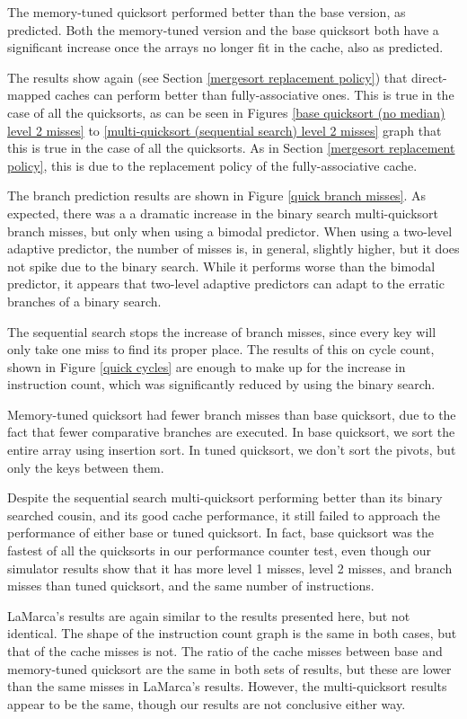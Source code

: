 The memory-tuned quicksort performed better than the base version, as predicted.
Both the memory-tuned version and the base quicksort both have a significant
increase once the arrays no longer fit in the cache, also as predicted.

The results show again (see Section \ref{mergesort replacement policy}) that
direct-mapped caches can perform better than fully-associative ones. This is
true in the case of all the quicksorts, as can be seen in Figures \ref{base
quicksort (no median) level 2 misses} to \ref{multi-quicksort (sequential
search) level 2 misses} graph that this is true in the case of all the
quicksorts. As in Section \ref{mergesort replacement policy}, this is due to the
replacement policy of the fully-associative cache.

The branch prediction results are shown in Figure \ref{quick branch misses}. As
expected, there was a a dramatic increase in the binary search multi-quicksort
branch misses, but only when using a bimodal predictor. When using a two-level
adaptive predictor, the number of misses is, in general, slightly higher, but it
does not spike due to the binary search. While it performs worse than the
bimodal predictor, it appears that two-level adaptive predictors can adapt to
the erratic branches of a binary search.

The sequential search stops the increase of branch misses, since every key will
only take one miss to find its proper place. The results of this on cycle
count, shown in Figure \ref{quick cycles} are enough to make up for the increase
in instruction count, which was significantly reduced by using the binary
search.

Memory-tuned quicksort had fewer branch misses than base quicksort, due to the fact
that fewer comparative branches are executed. In base quicksort, we sort the
entire array using insertion sort. In tuned quicksort, we don't sort the pivots,
but only the keys between them.

Despite the sequential search multi-quicksort performing better than its
binary searched cousin, and its good cache performance, it still failed to
approach the performance of either base or tuned quicksort. In fact, base
quicksort was the fastest of all the quicksorts in our performance counter test,
even though our simulator results show that it has more level 1 misses, level 2
misses, and branch misses than tuned quicksort, and the same number of
instructions.

LaMarca's results are again similar to the results presented here, but not
identical. The shape of the instruction count graph is the same in both cases,
but that of the cache misses is not. The ratio of the cache misses between base
and memory-tuned quicksort are the same in both sets of results, but these are lower
than the same misses in LaMarca's results. However, the multi-quicksort results
appear to be the same, though our results are not conclusive either way.


